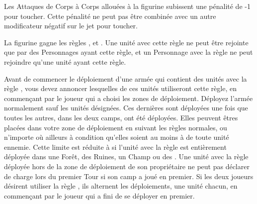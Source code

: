 Les Attaques de Corps à Corps allouées à la figurine subissent une pénalité de -1 pour toucher. Cette pénalité ne peut pas être combinée avec un autre modificateur négatif sur le jet pour toucher.


La figurine gagne les règles \magicalattacks{}, \immunetopsychology{} et . Une unité avec cette règle ne peut être rejointe que par des Personnages ayant cette règle, et un Personnage avec la règle \otherworldly{} ne peut rejoindre qu'une unité ayant cette règle.


Avant de commencer le déploiement d'une armée qui contient des unités avec la règle \scout{}, vous devez annoncer lesquelles de ces unités utiliseront cette règle, en commençant par le joueur qui a choisi les zones de déploiement. Déployez l'armée normalement sauf les unités désignées. Ces dernières sont déployées une fois que toutes les autres, dans les deux camps, ont été déployées. Elles peuvent êtres placées dans votre zone de déploiement en suivant les règles normales, ou n'importe où ailleurs à condition qu'elles soient au moins à  de toute unité ennemie. Cette limite est réduite à  si l'unité avec la règle \scout{} est entièrement déployée dans une Forêt, des Ruines, un Champ ou des \water{}. Une unité avec la règle \scout{} déployée hors de la zone de déploiement de son propriétaire ne peut pas déclarer de charge lors du premier Tour si son camp a joué en premier. Si les deux joueurs désirent utiliser la règle \scout{}, ils alternent les déploiements, une unité chacun, en commençant par le joueur qui a fini de se déployer en premier.


